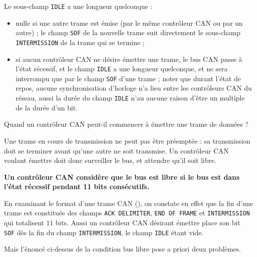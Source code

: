Le sous-champ \texttt{IDLE} a une longueur quelconque :
\begin{itemize}
  \item nulle si une autre trame est émise (par le même contrôleur CAN ou par un autre) ; le champ \texttt{SOF} de la nouvelle trame suit directement le sous-champ \texttt{INTERMISSION} de la trame qui se termine ;
  \item si aucun contrôleur CAN ne désire émettre une trame, le bus CAN passe à l'état récessif, et le champ \texttt{IDLE} a une longueur quelconque, et ne sera interrompu que par le champ \texttt{SOF} d'une trame ; noter que durant l'état de repos, aucune synchronisation d'horloge n'a lieu entre les contrôleurs CAN du réseau, aussi la durée du champ \texttt{IDLE} n'au aucune raison d'être un multiple de la durée d'un bit.
\end{itemize}





Quand un contrôleur CAN peut-il commencer à émettre une trame de données ?

Une trame en cours de transmission ne peut pas être préemptée : sa transmission doit se terminer avant qu'une autre ne soit transmise. Un contrôleur CAN voulant émettre doit donc surveiller le bus, et attendre qu'il soit libre.

{\bf Un contrôleur CAN considère que le bus est libre si le bus est dans l’état récessif pendant 11 bits consécutifs.}

En examinant le format d'une trame CAN (), on constate en effet que la fin d'une trame est constituée des champs \texttt{ACK DELIMITER}, \texttt{END OF FRAME} et \texttt{INTERMISSION} qui totalisent $11$ bits. Aussi un contrôleur CAN désirant émettre place son bit \texttt{SOF} dès la fin du champ \texttt{INTERMISSION}, le champ \texttt{IDLE} étant vide.

%

Mais l'énoncé ci-dessus de la condition bus libre pose a priori deux problèmes.

